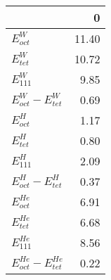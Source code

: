 \begin{tabular}{lr}
\toprule
 & 0 \\
\midrule
$E_{oct}^{W}$ & 11.40 \\
$E_{tet}^{W}$ & 10.72 \\
$E_{111}^{W}$ & 9.85 \\
$E_{oct}^{W} - E_{tet}^{W}$ & 0.69 \\
$E_{oct}^{H}$ & 1.17 \\
$E_{tet}^{H}$ & 0.80 \\
$E_{111}^{H}$ & 2.09 \\
$E_{oct}^{H} - E_{tet}^{H}$ & 0.37 \\
$E_{oct}^{He}$ & 6.91 \\
$E_{tet}^{He}$ & 6.68 \\
$E_{111}^{He}$ & 8.56 \\
$E_{oct}^{He} - E_{tet}^{He}$ & 0.22 \\
\bottomrule
\end{tabular}
